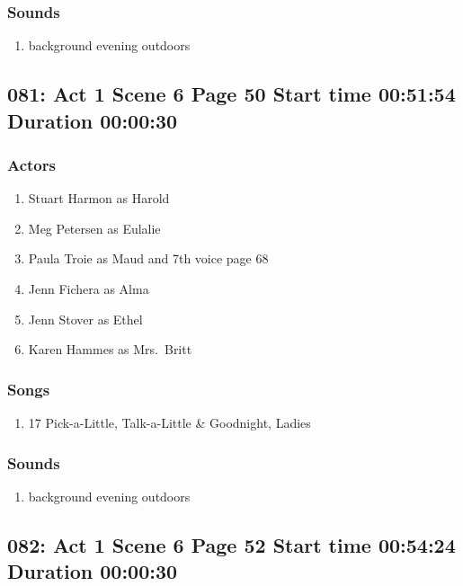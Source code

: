 \subsubsection{Sounds}
\begin{enumerate}
\item background evening outdoors
\end{enumerate}
\subsection{081: Act 1 Scene 6 Page 50 Start time 00:51:54 Duration 00:00:30}

\subsubsection{Actors}
\begin{enumerate}
\item Stuart Harmon as Harold
\item Meg Petersen as Eulalie
\item Paula Troie as Maud and 7th voice page 68
\item Jenn Fichera as Alma
\item Jenn Stover as Ethel
\item Karen Hammes as Mrs.~Britt
\end{enumerate}

\subsubsection{Songs}
\begin{enumerate}
\item 17 Pick-a-Little, Talk-a-Little \& Goodnight, Ladies
\end{enumerate}\subsubsection{Sounds}
\begin{enumerate}
\item background evening outdoors
\end{enumerate}
\subsection{082: Act 1 Scene 6 Page 52 Start time 00:54:24 Duration 00:00:30}

